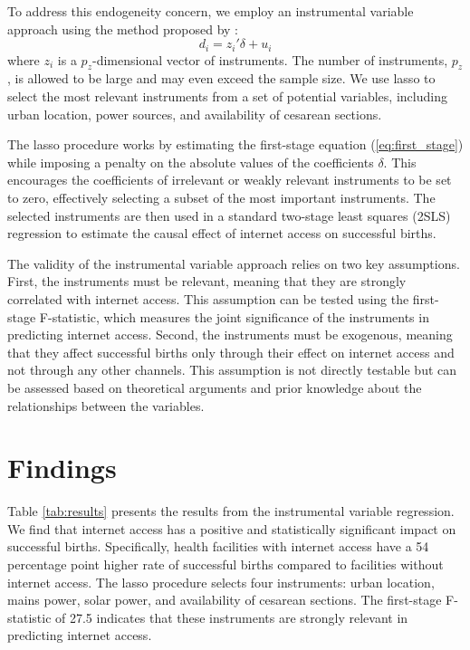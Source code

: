 \documentclass[12pt]{article}
\begin{document}
To address this endogeneity concern, we employ an instrumental variable approach using the method proposed by \citet{Belloni2012}:
\begin{equation}
  d_i = z_i'\delta + u_i
  \label{eq:first_stage}
\end{equation}
where $z_i$ is a $p_z$-dimensional vector of instruments. The number of instruments, $p_z$, is allowed to be large and may even exceed the sample size. We use lasso to select the most relevant instruments from a set of potential variables, including urban location, power sources, and availability of cesarean sections.

The lasso procedure works by estimating the first-stage equation (\ref{eq:first_stage}) while imposing a penalty on the absolute values of the coefficients $\delta$. This encourages the coefficients of irrelevant or weakly relevant instruments to be set to zero, effectively selecting a subset of the most important instruments. The selected instruments are then used in a standard two-stage least squares (2SLS) regression to estimate the causal effect of internet access on successful births.

The validity of the instrumental variable approach relies on two key assumptions. First, the instruments must be relevant, meaning that they are strongly correlated with internet access. This assumption can be tested using the first-stage F-statistic, which measures the joint significance of the instruments in predicting internet access. Second, the instruments must be exogenous, meaning that they affect successful births only through their effect on internet access and not through any other channels. This assumption is not directly testable but can be assessed based on theoretical arguments and prior knowledge about the relationships between the variables.

\section{Findings}
Table \ref{tab:results} presents the results from the instrumental variable regression. We find that internet access has a positive and statistically significant impact on successful births. Specifically, health facilities with internet access have a 54 percentage point higher rate of successful births compared to facilities without internet access. The lasso procedure selects four instruments: urban location, mains power, solar power, and availability of cesarean sections. The first-stage F-statistic of 27.5 indicates that these instruments are strongly relevant in predicting internet access.
\end{document}
